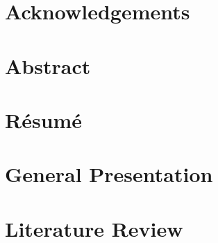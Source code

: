 \documentclass[12pt, a4paper]{report}
\begin{document}
\setmainlanguage{english}



\setmainlanguage{khmer}


\setmainlanguage{french}


\setmainlanguage{english}



\setmainlanguage{english}
\chapter*{Acknowledgements}

\newpage

\setmainlanguage{khmer}
\chapter*{}

\newpage

\setmainlanguage{english}
\chapter*{Abstract}


\setmainlanguage{french}
\chapter*{Résumé}


\setmainlanguage{french}

\tableofcontents
\newpage

\listoffigures
\newpage

\listoftables
\newpage



\setmainlanguage{english}
\clearpage
{}
\pagestyle{fancy}

\chapter{General Presentation}


\chapter{Literature Review}

\end{document}
